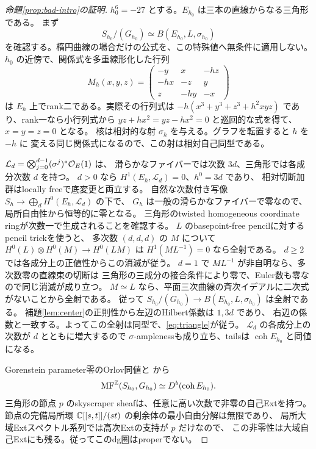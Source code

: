 \begin{proof}[命題\ref{prop:bad-intro}の証明]
 \(h_0^6=-27\) とする。\(E_{h_0}\) は三本の直線からなる三角形である。
 まず
 \[
 S_{h_0}/(G_{h_0})\simeq B(E_{h_0},L,\sigma_{h_0})                 \tag{6}\label{eq:triangle}
 \]
 を確認する。楕円曲線の場合だけの公式を、この特殊値へ無条件に適用しない。
 \(h_0\) の近傍で、関係式を多重線形化した行列
 \[
 M_h(x,y,z)=
 \begin{pmatrix}-y&x&-hz\\-hx&-z&y\\z&-hy&-x\end{pmatrix}
 \]
 は \(E_h\) 上でrank二である。実際その行列式は
 \(-h(x^3+y^3+z^3+h^2xyz)\) であり、rank一なら小行列式から
 \(yz+hx^2=yz-hx^2=0\) と巡回的な式を得て、\(x=y=z=0\) となる。
 核は相対的な射 \(\sigma_h\) を与える。グラフを転置すると \(h\) を \(-h\) に
 変える同じ関係式になるので、この射は相対自己同型である。

 \(\mathcal L_d=\bigotimes_{j=0}^{d-1}(\sigma^j)^*\mathcal O_E(1)\) は、
 滑らかなファイバーでは次数 \(3d\)、三角形では各成分次数 \(d\) を持つ。
 \(d>0\) なら \(H^1(E_h,\mathcal L_d)=0\)、\(h^0=3d\) であり、
 相対切断加群はlocally freeで底変更と両立する。
 自然な次数付き写像 \(S_h\to\bigoplus_dH^0(E_h,\mathcal L_d)\) の下で、
 \(G_h\) は一般の滑らかなファイバーで零なので、局所自由性から恒等的に零となる。
 三角形のtwisted homogeneous coordinate ringが次数一で生成されることを確認する。
 \(L\) のbasepoint-free pencilに対するpencil trickを使うと、
 多次数 \((d,d,d)\) の \(M\) について
 \(H^0(L)\otimes H^0(M)\to H^0(LM)\) は
 \(H^1(ML^{-1})=0\) なら全射である。
 \(d\ge2\) では各成分上の正値性からこの消滅が従う。
 \(d=1\) で \(ML^{-1}\) が非自明なら、多次数零の直線束の切断は
 三角形の三成分の接合条件により零で、Euler数も零なので同じ消滅が成り立つ。
 \(M\simeq L\) なら、平面三次曲線の斉次イデアルに二次式がないことから全射である。
 従って \(S_{h_0}/(G_{h_0})\to B(E_{h_0},L,\sigma_{h_0})\) は全射である。
 補題\ref{lem:center}の正則性から左辺のHilbert係数は \(1,3d\) であり、
 右辺の係数と一致する。よってこの全射は同型で、\eqref{eq:triangle}が従う。
 \(\mathcal L_d\) の各成分上の次数が \(d\) とともに増大するので
 \(\sigma\)-amplenessも成り立ち、tailsは \(\operatorname{coh}E_{h_0}\) と同値になる。

 Gorenstein parameter零のOrlov同値と \cite[Theorem 5.8]{CCKM}から
 \[
 \operatorname{MF}^\mathbb Z(S_{h_0},G_{h_0})\simeq D^b(\operatorname{coh}E_{h_0}).
 \]
 三角形の節点 \(p\) のskyscraper sheafは、任意に高い次数で非零の自己Extを持つ。
 節点の完備局所環 \(\mathbb C[[s,t]]/(st)\) の剰余体の最小自由分解は無限であり、
 局所大域Extスペクトル系列では高次Extの支持が \(p\) だけなので、
 この非零性は大域自己Extにも残る。従ってこのdg圏はproperでない。


\end{proof}

